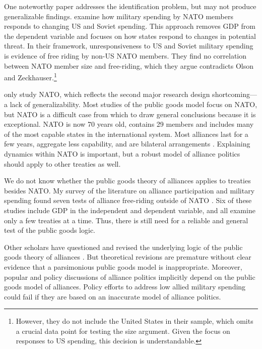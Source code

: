 \documentclass[12pt]{article}
\begin{document}
One noteworthy paper addresses the identification problem, but may not produce generalizable findings. 
\citet{PluemperNeumayer2015} examine how military spending by NATO members responds to changing US and Soviet spending.
This approach removes GDP from the dependent variable and focuses on how states respond to changes in potential threat.  
In their framework, unresponsiveness to US and Soviet military spending is evidence of free riding by non-US NATO members.
They find no correlation between NATO member size and free-riding, which they argue contradicts Olson and Zeckhauser.\footnote{
However, they do not include the United States in their sample, which omits a crucial data point for testing the size argument. Given the focus on responses to US spending, this decision is understandable.}


\citet{PluemperNeumayer2015} only study NATO, which reflects the second major research design shortcoming--- a lack of generalizability. 
Most studies of the public goods model focus on NATO, but NATO is a difficult case from which to draw general conclusions because it is exceptional. 
NATO is now 70 years old, contains 29 members and includes many of the most capable states in the international system. 
Most alliances last for a few years, aggregate less capability, and are bilateral arrangements \citep{Leedsetal2002}. 
Explaining dynamics within NATO is important, but a robust model of alliance politics should apply to other treaties as well. 


We do not know whether the public goods theory of alliances applies to treaties besides NATO. 
My survey of the literature on alliance participation and military spending found seven tests of alliance free-riding outside of NATO \citep{Russett1970, Starr1974, Reisinger1983, Thies1987, ConybeareSandler1990, OnealWhatley1996, Siroky2012}. 
Six of these studies include GDP in the independent and dependent variable, and all examine only a few treaties at a time. 
Thus, there is still need for a reliable and general test of the public goods logic. 


Other scholars have questioned and revised the underlying logic of the public goods theory of alliances \citep{Palmer1990, SandlerHartley2001, Norrlof2010}.  
But theoretical revisions are premature without clear evidence that a parsimonious public goods model is inappropriate.
Moreover, popular and policy discussions of alliance politics implicitly depend on the public goods model of alliances. 
Policy efforts to address low allied military spending could fail if they are based on an inaccurate model of alliance politics. 
\end{document}
